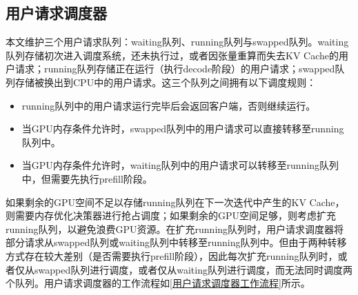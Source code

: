 \documentclass[a4paper, nosysfonts]{hpcchina}
\begin{document}
\subsection{用户请求调度器}
本文维护三个用户请求队列：waiting队列、running队列与swapped队列。waiting队列存储初次进入调度系统，还未执行过，或者因张量重算而失去KV Cache的用户请求；running队列存储正在运行（执行decode阶段）的用户请求；swapped队列存储被换出到CPU中的用户请求。这三个队列之间拥有以下调度规则： \par
\begin{itemize}
  \item running队列中的用户请求运行完毕后会返回客户端，否则继续运行。
  \item 当GPU内存条件允许时，swapped队列中的用户请求可以直接转移至running队列中。
  \item 当GPU内存条件允许时，waiting队列中的用户请求可以转移至running队列中，但需要先执行prefill阶段。
\end{itemize}
如果剩余的GPU空间不足以存储running队列在下一次迭代中产生的KV Cache，则需要内存优化决策器进行抢占调度；如果剩余的GPU空间足够，则考虑扩充running队列，以避免浪费GPU资源。在扩充running队列时，用户请求调度器将部分请求从swapped队列或waiting队列中转移至running队列中。但由于两种转移方式存在较大差别（是否需要执行prefill阶段），因此每次扩充running队列时，或者仅从swapped队列进行调度，或者仅从waiting队列进行调度，而无法同时调度两个队列。用户请求调度器的工作流程如\ref{用户请求调度器工作流程}所示。
\end{document}
